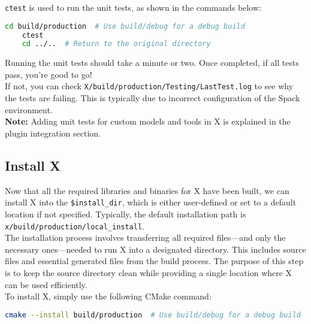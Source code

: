 \documentclass[a4paper,12pt]{article}
\begin{document}
\texttt{ctest} is used to run the unit tests, as shown in the commands below:

\vspace{1em}
\begin{lstlisting}[language=bash]
    cd build/production  # Use build/debug for a debug build
    ctest
    cd ../..  # Return to the original directory
\end{lstlisting}
\vspace{1em}

Running the unit tests should take a minute or two. Once completed, if all tests pass, you're good to go! \\

If not, you can check \texttt{X/build/production/Testing/LastTest.log} to see why the tests are failing. This is typically due to incorrect configuration of the Spack environment. \\

\textbf{Note:} Adding unit tests for custom models and tools in X is explained in the plugin integration section.

\subsection{Install X}

Now that all the required libraries and binaries for X have been built, we can install X into the \texttt{\$install\_dir}, which is either user-defined or set to a default location if not specified. Typically, the default installation path is \texttt{x/build/production/local\_install}. \\ 

The installation process involves transferring all required files—and only the necessary ones—needed to run X into a designated directory. This includes source files and essential generated files from the build process. The purpose of this step is to keep the source directory clean while providing a single location where X can be used efficiently. \\

To install X, simply use the following CMake command:  

\vspace{1em}  
\begin{lstlisting}[language=bash]  
cmake --install build/production  # Use build/debug for a debug build  
\end{lstlisting}  
\vspace{1em}  
 
\end{document}
